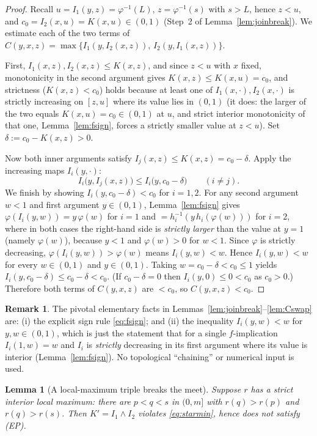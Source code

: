 \documentclass{amsart}
\theoremstyle{plain}
\newtheorem{lemma}{Lemma}
\theoremstyle{definition}
\newtheorem{remark}{Remark}
\begin{document}
\begin{proof}
Recall $u=I_1(y,z)=\varphi^{-1}(L)$, $z=\varphi^{-1}(s)$ with $s>L$, hence $z<u$, and
$c_0=I_2(x,u)=K(x,u)\in(0,1)$ (Step~2 of Lemma~\ref{lem:joinbreak}).  We estimate each of
the two terms of $C(y,x,z)=\max\{I_1(y,I_2(x,z)),\,I_2(y,I_1(x,z))\}$.

First, $I_1(x,z),I_2(x,z)\le K(x,z)$, and since $z<u$ with $x$ fixed, monotonicity in the
second argument gives $K(x,z)\le K(x,u)=c_0$, and strictness ($K(x,z)<c_0$) holds because at
least one of $I_1(x,\cdot),I_2(x,\cdot)$ is strictly increasing on $[z,u]$ where its value
lies in $(0,1)$ (it does: the larger of the two equals $K(x,u)=c_0\in(0,1)$ at $u$, and
strict interior monotonicity of that one, Lemma~\ref{lem:fsign}, forces a strictly smaller
value at $z<u$).  Set $\delta:=c_0-K(x,z)>0$.

Now both inner arguments satisfy $I_j(x,z)\le K(x,z)=c_0-\delta$.  Apply the increasing maps
$I_i(y,\cdot)$:
\[
I_i\bigl(y,I_j(x,z)\bigr)\le I_i\bigl(y,c_0-\delta\bigr)\qquad(i\ne j).
\]
We finish by showing $I_i(y,c_0-\delta)<c_0$ for $i=1,2$.  For any second argument $w<1$ and
first argument $y\in(0,1)$, Lemma~\ref{lem:fsign} gives
$\varphi(I_i(y,w))=y\,\varphi(w)$ for $i=1$ and $=h_i^{-1}(y\,h_i(\varphi(w)))$ for $i=2$,
where in both cases the right-hand side is \emph{strictly larger} than the value at $y=1$
(namely $\varphi(w)$), because $y<1$ and $\varphi(w)>0$ for $w<1$.  Since $\varphi$ is
strictly decreasing, $\varphi(I_i(y,w))>\varphi(w)$ means $I_i(y,w)<w$.  Hence
$I_i(y,w)<w$ for every $w\in(0,1)$ and $y\in(0,1)$.  Taking $w=c_0-\delta<c_0\le 1$ yields
$I_i(y,c_0-\delta)\le c_0-\delta<c_0$.  (If $c_0-\delta=0$ then $I_i(y,0)\le 0<c_0$ as
$c_0>0$.)  Therefore both terms of $C(y,x,z)$ are $<c_0$, so $C(y,x,z)<c_0$.
\end{proof}

\begin{remark}\label{rem:cleanjoin}
The pivotal elementary facts in Lemmas~\ref{lem:joinbreak}--\ref{lem:Cswap} are: (i) the
explicit sign rule \eqref{eq:fsign}; and (ii) the inequality $I_i(y,w)<w$ for $y,w\in(0,1)$,
which is just the statement that for a single $f$-implication $I_i(1,w)=w$ and $I_i$ is
\emph{strictly} decreasing in its first argument where its value is interior
(Lemma~\ref{lem:fsign}).  No topological ``chaining'' or numerical input is used.
\end{remark}

\begin{lemma}[A local-maximum triple breaks the meet]\label{lem:meetbreak}
Suppose $r$ has a strict interior local maximum: there are $p<q<s$ in $(0,m]$ with
$r(q)>r(p)$ and $r(q)>r(s)$.  Then $K'=I_1\wedge I_2$ violates \eqref{eq:starmin}, hence
does not satisfy \textup{(EP)}.
\end{lemma}
\end{document}
